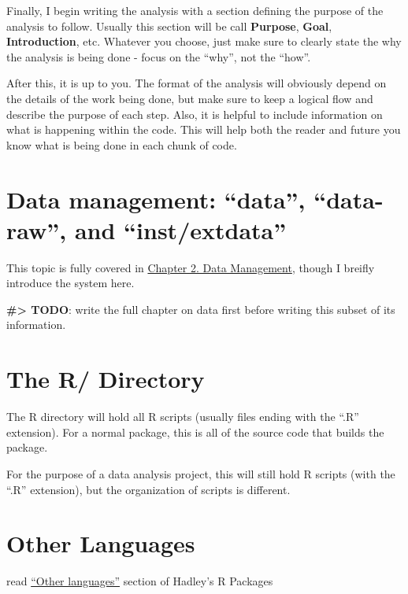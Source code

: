 \documentclass[]{book}
\begin{document}
Finally, I begin writing the analysis with a section defining the purpose of the analysis to follow. Usually this section will be call \textbf{Purpose}, \textbf{Goal}, \textbf{Introduction}, etc. Whatever you choose, just make sure to clearly state the why the analysis is being done - focus on the ``why'', not the ``how''.

After this, it is up to you. The format of the analysis will obviously depend on the details of the work being done, but make sure to keep a logical flow and describe the purpose of each step. Also, it is helpful to include information on what is happening within the code. This will help both the reader and future you know what is being done in each chunk of code.

\hypertarget{data-management-data-data-raw-and-instextdata}{%
\section{Data management: ``data'', ``data-raw'', and ``inst/extdata''}\label{data-management-data-data-raw-and-instextdata}}

This topic is fully covered in \protect\hyperlink{data-management}{Chapter 2. Data Management}, though I breifly introduce the system here.

\textbf{\#\textgreater{} TODO}: write the full chapter on data first before writing this subset of its information.

\hypertarget{the-r-directory}{%
\section{The R/ Directory}\label{the-r-directory}}

The R directory will hold all R scripts (usually files ending with the ``.R'' extension). For a normal package, this is all of the source code that builds the package.

For the purpose of a data analysis project, this will still hold R scripts (with the ``.R'' extension), but the organization of scripts is different.

\hypertarget{other-languages}{%
\section{Other Languages}\label{other-languages}}

read \href{https://r-pkgs.org/inst.html\#inst-other-langs}{``Other languages''} section of Hadley's R Packages
\end{document}
